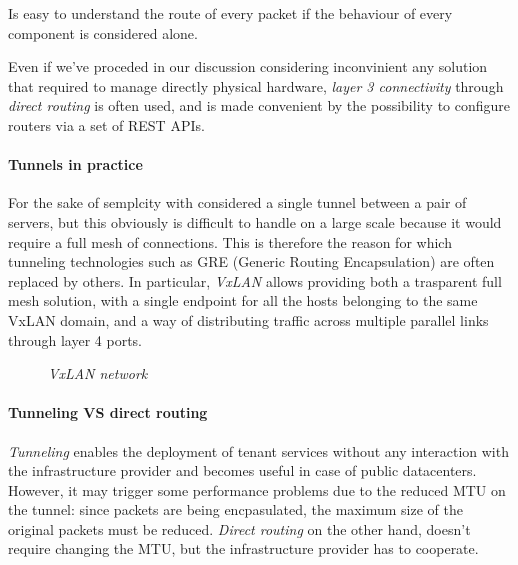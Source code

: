 \begin{note}
    Is easy to understand the route of every packet if the behaviour of every
    component is considered alone.
\end{note}
\begin{note}
    Even if we've proceded in our discussion considering inconvinient any
    solution that required to manage directly physical hardware, \emph{layer 3
    connectivity} through \emph{direct routing} is often used, and is made
    convenient by the possibility to configure routers via a set of REST APIs.
\end{note}

\paragraph{Tunnels in practice}
For the sake of semplcity with considered a single tunnel between a pair of
servers, but this obviously is difficult to handle on a large scale because
it would require a full mesh of connections. This is therefore the reason for
which tunneling technologies such as GRE (Generic Routing Encapsulation) are
often replaced by others. In particular, \emph{VxLAN} allows providing both a
trasparent full mesh solution, with a single endpoint for all the hosts
belonging to the same VxLAN domain, and a way of distributing traffic across
multiple parallel links through layer 4 ports.

\begin{figure}[h!]
    \centering
    \caption{\emph{VxLAN network}}
\end{figure}

\paragraph{Tunneling VS direct routing}
\emph{Tunneling} enables the deployment of tenant services without any
interaction with the infrastructure provider and becomes useful in case of
public datacenters. However, it may trigger some performance problems due to
the reduced MTU on the tunnel: since packets are being encpasulated, the maximum
size of the original packets must be reduced. \emph{Direct routing} on the other
hand, doesn't require changing the MTU, but the infrastructure provider has to
cooperate.